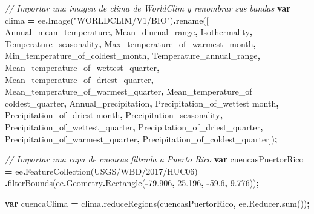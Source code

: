 \documentclass[
  12pt,
  letterpaper,
  twoside]{book}
\newenvironment{Shaded}{\begin{snugshade}}{\end{snugshade}}
\newcommand{\AttributeTok}[1]{\textcolor[rgb]{0.77,0.63,0.00}{#1}}
\newcommand{\CommentTok}[1]{\textcolor[rgb]{0.56,0.35,0.01}{\textit{#1}}}
\newcommand{\FloatTok}[1]{\textcolor[rgb]{0.00,0.00,0.81}{#1}}
\newcommand{\FunctionTok}[1]{\textcolor[rgb]{0.00,0.00,0.00}{#1}}
\newcommand{\KeywordTok}[1]{\textcolor[rgb]{0.13,0.29,0.53}{\textbf{#1}}}
\newcommand{\NormalTok}[1]{#1}
\newcommand{\OperatorTok}[1]{\textcolor[rgb]{0.81,0.36,0.00}{\textbf{#1}}}
\newcommand{\StringTok}[1]{\textcolor[rgb]{0.31,0.60,0.02}{#1}}
\begin{document}
\begin{Shaded}
\begin{Highlighting}[]
\CommentTok{// Importar una imagen de clima de WorldClim y renombrar sus bandas}
\KeywordTok{var}\NormalTok{ clima }\OperatorTok{=}\NormalTok{ ee}\OperatorTok{.}\FunctionTok{Image}\NormalTok{(}\StringTok{"WORLDCLIM/V1/BIO"}\NormalTok{)}\OperatorTok{.}\FunctionTok{rename}\NormalTok{([}
  \StringTok{\textquotesingle{}Annual\_mean\_temperature\textquotesingle{}}\OperatorTok{,}
  \StringTok{\textquotesingle{}Mean\_diurnal\_range\textquotesingle{}}\OperatorTok{,}
  \StringTok{\textquotesingle{}Isothermality\textquotesingle{}}\OperatorTok{,}
  \StringTok{\textquotesingle{}Temperature\_seasonality\textquotesingle{}}\OperatorTok{,}
  \StringTok{\textquotesingle{}Max\_temperature\_of\_warmest\_month\textquotesingle{}}\OperatorTok{,}
  \StringTok{\textquotesingle{}Min\_temperature\_of\_coldest\_month\textquotesingle{}}\OperatorTok{,}
  \StringTok{\textquotesingle{}Temperature\_annual\_range\textquotesingle{}}\OperatorTok{,}
  \StringTok{\textquotesingle{}Mean\_temperature\_of\_wettest\_quarter\textquotesingle{}}\OperatorTok{,}
  \StringTok{\textquotesingle{}Mean\_temperature\_of\_driest\_quarter\textquotesingle{}}\OperatorTok{,}
  \StringTok{\textquotesingle{}Mean\_temperature\_of\_warmest\_quarter\textquotesingle{}}\OperatorTok{,}
  \StringTok{\textquotesingle{}Mean\_temperature\_of coldest\_quarter\textquotesingle{}}\OperatorTok{,}
  \StringTok{\textquotesingle{}Annual\_precipitation\textquotesingle{}}\OperatorTok{,}
  \StringTok{\textquotesingle{}Precipitation\_of\_wettest month\textquotesingle{}}\OperatorTok{,}
  \StringTok{\textquotesingle{}Precipitation\_of\_driest month\textquotesingle{}}\OperatorTok{,}
  \StringTok{\textquotesingle{}Precipitation\_seasonality\textquotesingle{}}\OperatorTok{,}
  \StringTok{\textquotesingle{}Precipitation\_of\_wettest\_quarter\textquotesingle{}}\OperatorTok{,}
  \StringTok{\textquotesingle{}Precipitation\_of\_driest\_quarter\textquotesingle{}}\OperatorTok{,}
  \StringTok{\textquotesingle{}Precipitation\_of\_warmest\_quarter\textquotesingle{}}\OperatorTok{,}
  \StringTok{\textquotesingle{}Precipitation\_of\_coldest\_quarter\textquotesingle{}}\NormalTok{])}\OperatorTok{;}

\CommentTok{// Importar una capa de cuencas filtrada a Puerto Rico}
\KeywordTok{var}\NormalTok{ cuencasPuertorRico }\OperatorTok{=}\NormalTok{ ee}\OperatorTok{.}\FunctionTok{FeatureCollection}\NormalTok{(}\StringTok{\textquotesingle{}USGS/WBD/2017/HUC06\textquotesingle{}}\NormalTok{)}
  \OperatorTok{.}\FunctionTok{filterBounds}\NormalTok{(ee}\OperatorTok{.}\AttributeTok{Geometry}\OperatorTok{.}\FunctionTok{Rectangle}\NormalTok{(}\OperatorTok{{-}}\FloatTok{79.906}\OperatorTok{,} \FloatTok{25.196}\OperatorTok{,} \OperatorTok{{-}}\FloatTok{59.6}\OperatorTok{,} \FloatTok{9.776}\NormalTok{))}\OperatorTok{;}

\KeywordTok{var}\NormalTok{ cuencaClima }\OperatorTok{=}\NormalTok{ clima}\OperatorTok{.}\FunctionTok{reduceRegions}\NormalTok{(cuencasPuertorRico}\OperatorTok{,}\NormalTok{ ee}\OperatorTok{.}\AttributeTok{Reducer}\OperatorTok{.}\FunctionTok{sum}\NormalTok{())}\OperatorTok{;}
\end{Highlighting}
\end{Shaded}
\end{document}
